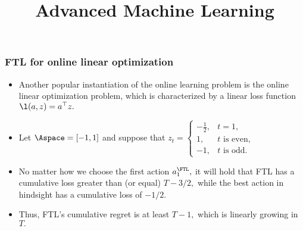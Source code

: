 \documentclass[11pt,compress,t,notes=noshow, xcolor=table]{beamer}
\title{Advanced Machine Learning}
\date{}
\begin{document}
	
	
	
	
	\sloppy
	


\begin{frame} \frametitle{FTL for online linear optimization}
	\small
	\begin{itemize}
		\item Another popular instantiation of the online learning problem is the online linear optimization problem, which is characterized by a linear loss function $\l(a,z)=a^\top z.$ 
		\pause
		\item  Let $\Aspace=[-1,1]$ and  suppose that 
		$  z_t = \begin{cases}
			-\frac12, & \mbox{$t=1,$} \\
			1, & \mbox{$t$ is even,}\\
			-1, & \mbox{$t$ is odd.}
		\end{cases} $
		\pause 
		\item No matter how we choose the first action $a_1^{\FTL},$ it will hold that FTL has a cumulative loss greater than (or equal) $T-3/2,$ while the best action in hindsight has a cumulative loss of $-1/2.$ 
		\item Thus, FTL's cumulative regret is at least $T-1,$ which is linearly growing in $T.$
	\end{itemize}
\end{frame}
\end{document}
